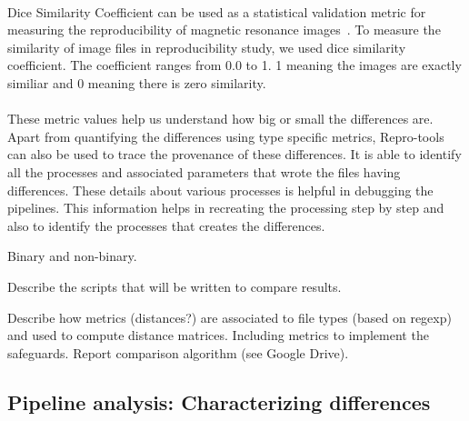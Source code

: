 \documentclass{article}
\begin{document}
\paragraph{} Dice Similarity Coefficient can be used as a statistical validation metric for measuring the reproducibility
 of magnetic resonance images~\cite{Zou2004}. To measure the similarity of image files in reproducibility study, we used dice similarity coefficient. 
The coefficient ranges from 0.0 to 1. 1 meaning the images are exactly similiar and 0 meaning there is zero similarity.
\paragraph{} These metric values help us understand how big or small the differences are. Apart from quantifying 
the differences using type specific metrics, Repro-tools can also be used to trace the provenance of these differences.
 It is able to identify all the processes and associated parameters that wrote the files having differences. 
These details about various processes is helpful in debugging the pipelines. This information helps in 
recreating the processing step by step and also to identify the processes that creates the differences.


Binary and non-binary.

Describe the scripts that will be written to compare results.

Describe how metrics (distances?) are associated to file types (based
on regexp) and used to compute distance matrices. Including metrics to
implement the safeguards. Report comparison algorithm (see Google
Drive).


\subsection{Pipeline analysis: Characterizing differences}
\end{document}
